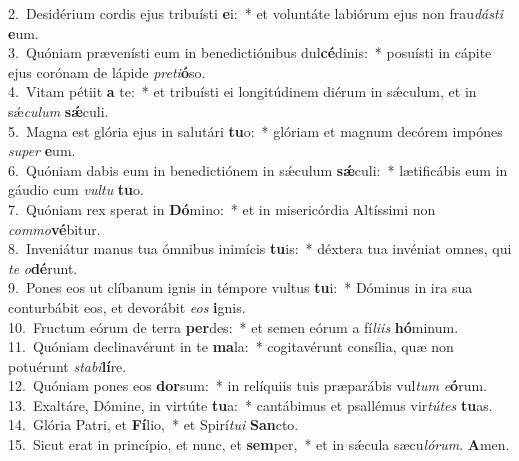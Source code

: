 {2.~}Desidérium cordis ejus tribuísti \textbf{e}i:~* et voluntáte labiórum ejus non frau\textit{dá}\textit{sti} \textbf{e}um.\\
{3.~}Quóniam prævenísti eum in benedictiónibus dul\textbf{cé}dinis:~* posuísti in cápite ejus corónam de lápide \textit{pre}\textit{ti}\textbf{ó}so.\\
{4.~}Vitam pétiit \textbf{a} te:~* et tribuísti ei longitúdinem diérum in sǽculum, et in sǽ\textit{cu}\textit{lum} \textbf{sǽ}culi.\\
{5.~}Magna est glória ejus in salutári \textbf{tu}o:~* glóriam et magnum decórem impónes \textit{su}\textit{per} \textbf{e}um.\\
{6.~}Quóniam dabis eum in benedictiónem in sǽculum \textbf{sǽ}culi:~* lætificábis eum in gáudio cum \textit{vul}\textit{tu} \textbf{tu}o.\\
{7.~}Quóniam rex sperat in \textbf{Dó}mino:~* et in misericórdia Altíssimi non \textit{com}\textit{mo}\textbf{vé}bitur.\\
{8.~}Inveniátur manus tua ómnibus inimícis \textbf{tu}is:~* déxtera tua invéniat omnes, qui \textit{te} \textit{o}\textbf{dé}runt.\\
{9.~}Pones eos ut clíbanum ignis in témpore vultus \textbf{tu}i:~* Dóminus in ira sua conturbábit eos, et devorábit \textit{e}\textit{os} \textbf{i}gnis.\\
{10.~}Fructum eórum de terra \textbf{per}des:~* et semen eórum a fí\textit{li}\textit{is} \textbf{hó}minum.\\
{11.~}Quóniam declinavérunt in te \textbf{ma}la:~* cogitavérunt consília, quæ non potuérunt \textit{sta}\textit{bi}\textbf{lí}re.\\
{12.~}Quóniam pones eos \textbf{dor}sum:~* in relíquiis tuis præparábis vul\textit{tum} \textit{e}\textbf{ó}rum.\\
{13.~}Exaltáre, Dómine, in virtúte \textbf{tu}a:~* cantábimus et psallémus vir\textit{tú}\textit{tes} \textbf{tu}as.\\
{14.~}Glória Patri, et \textbf{Fí}lio,~* et Spirí\textit{tu}\textit{i} \textbf{San}cto.\\
{15.~}Sicut erat in princípio, et nunc, et \textbf{sem}per,~* et in sǽcula sæcu\textit{ló}\textit{rum}. \textbf{A}men.\\
